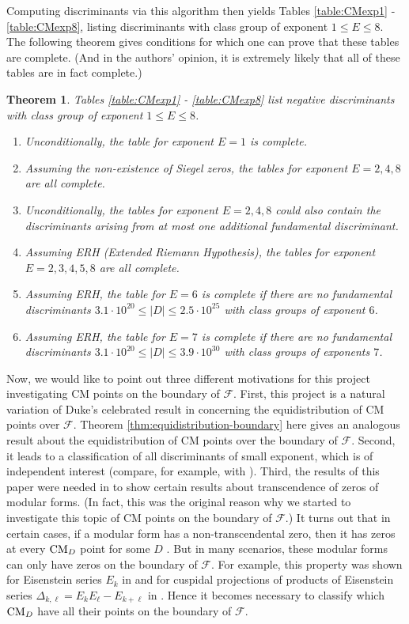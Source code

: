 \documentclass[11pt,letterpaper,reqno]{amsart}
\newtheorem{theorem}{Theorem}[section]
\numberwithin{equation}{section}
\numberwithin{figure}{section}
\numberwithin{table}{section}
\newcommand{\FF}{\mathcal{F}}
\newcommand{\CM}{\textnormal{CM}}
\begin{document}
Computing discriminants via this algorithm then yields Tables \ref{table:CMexp1} - \ref{table:CMexp8}, listing discriminants with class group of exponent $1 \le E \le 8$. 
The following theorem gives conditions for which one can prove that these tables are complete. (And in the authors' opinion, it is extremely likely that all of these tables are in fact complete.)
\begin{theorem} \label{thm:exp-tables-complete-under-certain-assumptions}
    Tables \ref{table:CMexp1} - \ref{table:CMexp8} list negative discriminants with class group of exponent $1 \le E \le 8$. 
    \begin{enumerate}
        \item Unconditionally, the table for exponent $E=1$ is complete. 
        \item Assuming the non-existence of Siegel zeros, the tables for exponent $E=2,4,8$ are all complete. 
        \item Unconditionally, the tables for exponent $E=2,4,8$ could also contain the discriminants arising from at most one additional fundamental discriminant.
        \item Assuming ERH (Extended Riemann Hypothesis), the tables for exponent $E = 2,3,4,5,8$ are all complete. 
        \item Assuming ERH, the table for $E=6$ is complete if there are no fundamental discriminants $ 3.1\cdot 10^{20} \le |D| \le 2.5 \cdot 10^{25}$ with class groups of exponent $6$.
        \item Assuming ERH, the table for $E=7$ is complete if there are no fundamental discriminants $ 3.1\cdot 10^{20} \le |D| \le 3.9 \cdot 10^{30}$ with class groups of exponents $7$.
    \end{enumerate}
\end{theorem}

Now, we would like to point out three different motivations for this project investigating CM points on the boundary of $\FF$. 
First, this project is a natural variation of Duke's celebrated result in \cite{duke} concerning the equidistribution of CM points over $\FF$. Theorem \ref{thm:equidistribution-boundary} here gives an analogous result about the equidistribution of CM points over the boundary of $\FF$. 
Second, it leads to a classification of all discriminants of small exponent, which is of independent interest (compare, for example, with \cite{fieldexponents}).
Third, the results of this paper were needed in \cite{our-first-paper} to show certain results about transcendence of zeros of modular forms. 
(In fact, this was the original reason why we started to investigate this topic of CM points on the boundary of $\FF$.) 
It turns out that in certain cases, if a modular form has a non-transcendental zero, then it has zeros at every $\CM_D$ point for some $D$ \cite[Lemma 3.1]{our-first-paper}. But in many scenarios, these modular forms can only have zeros on the boundary of $\FF$. 
For example, this property was shown for Eisenstein series $E_k$ in \cite{rankin-swinnerton-dyer} and for cuspidal projections of products of Eisenstein series $\Delta_{k,\ell} = E_k E_\ell - E_{k+\ell}$ in \cite{reitzes-vulakh-young,xue-zhu}. 
Hence it becomes necessary to classify which $\CM_D$ have all their points on the boundary of $\FF$.
\end{document}
